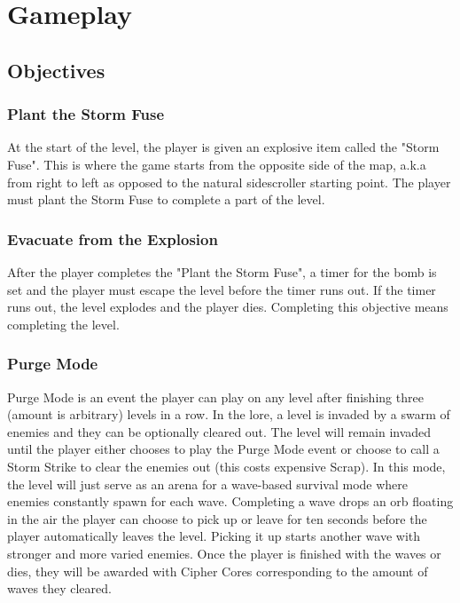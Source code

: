 \documentclass[12pt]{article}
\begin{document}
\section{Gameplay}

\subsection{Objectives}

\subsubsection{Plant the Storm Fuse}

At the start of the level, the player is given an explosive item called the "Storm Fuse". This is where the game starts from the  opposite side of the map, a.k.a from right to left as opposed to the natural sidescroller starting point. The player must plant the Storm Fuse to complete a part of the level. 

\subsubsection{Evacuate from the Explosion}

After the player completes the "Plant the Storm Fuse", a timer for the bomb is set and the player must escape the level before the timer runs out. If the timer runs out, the level explodes and the player dies. Completing this objective means completing the level. 

\subsubsection{Purge Mode}

Purge Mode is an event the player can play on any level after finishing three (amount is arbitrary) levels in a row. In the lore, a level is invaded by a swarm of enemies and they can be optionally cleared out. The level will remain invaded until the player either chooses to play the Purge Mode event or choose to call a Storm Strike to clear the enemies out (this costs expensive Scrap). In this mode, the level will just serve as an arena for a wave-based survival mode where enemies constantly spawn for each wave. Completing a wave drops an orb floating in the air the player can choose to pick up or leave for ten seconds before the player automatically leaves the level. Picking it up starts another wave with stronger and more varied enemies. Once the player is finished with the waves or dies, they will be awarded with Cipher Cores corresponding to the amount of waves they cleared.
\end{document}
